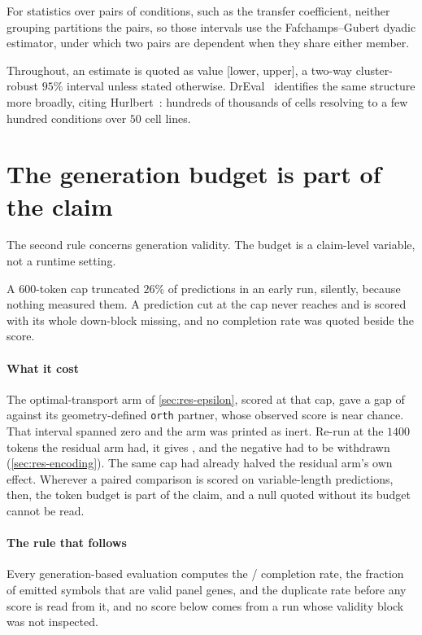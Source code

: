 For statistics over pairs of conditions, such as the transfer coefficient,
neither grouping partitions the pairs, so those intervals use the
Fafchamps--Gubert dyadic estimator, under which two pairs are dependent when
they share either member.

Throughout, an estimate is quoted as value [lower, upper], a two-way
cluster-robust $95\%$ interval unless stated otherwise. DrEval~\cite{dreval}
identifies the same structure more broadly, citing Hurlbert~\cite{hurlbert}:
hundreds of thousands of cells resolving to a few hundred conditions over $50$
cell lines.

\section{The generation budget is part of the claim}

The second rule concerns generation validity. The budget is a claim-level
variable, not a runtime setting.

A $600$-token cap truncated $26\%$ of predictions in an early run, silently,
because nothing measured them. A prediction cut at the cap never reaches \DOWN{}
and is scored with its whole down-block missing, and no completion rate was
quoted beside the score.

\paragraph{What it cost} The optimal-transport arm of
\cref{sec:res-epsilon}, scored at that cap, gave a gap of
 against its geometry-defined \texttt{orth}
partner, whose observed score is near chance. That interval spanned zero and the
arm was printed as inert. Re-run at the $1400$
tokens the residual arm had, it gives , and the
negative had to be withdrawn (\cref{sec:res-encoding}). The same cap had already
halved the residual arm's own effect. Wherever a paired comparison is scored on
variable-length predictions, then, the token budget is part of the claim, and a
null quoted without its budget cannot be read.

\paragraph{The rule that follows} Every generation-based evaluation computes the
\ENDCELL{}/\DOWN{} completion rate, the fraction of emitted symbols that are
valid panel genes, and the duplicate rate before any score is read from it, and
no score below comes from a run whose validity block was not inspected.

